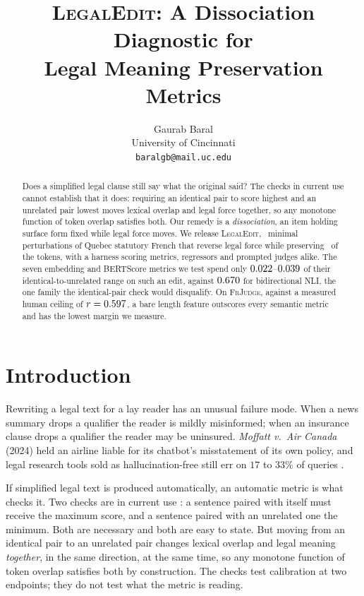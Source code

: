 \documentclass[11pt]{article}
\title{\textsc{LegalEdit}: A Dissociation Diagnostic for\\Legal Meaning Preservation Metrics}
\author{Gaurab Baral \\
  University of Cincinnati \\
  \texttt{baralgb@mail.uc.edu}}
\begin{document}
\maketitle

\begin{abstract}
Does a simplified legal clause still say what the original said? The checks in
current use cannot establish that it does: requiring an identical pair to score
highest and an unrelated pair lowest moves lexical overlap and legal force
together, so any monotone function of token overlap satisfies both. Our remedy
is a \emph{dissociation}, an item holding surface form fixed while legal force
moves. We release \textsc{LegalEdit}, \numedits\ minimal perturbations of Quebec
statutory French that reverse legal force while preserving \meanjaccard\ of the
tokens, with a harness scoring metrics, regressors and prompted judges alike.
The seven embedding and BERTScore metrics we test spend only
$0.022$--$0.039$ of their identical-to-unrelated range on such an
edit, against $0.670$ for bidirectional NLI, the one family the
identical-pair check would disqualify. On \textsc{FrJudge}, against a measured
human ceiling of $r=0.597$, a bare length feature outscores every semantic
metric and has the lowest margin we measure.
\end{abstract}

\section{Introduction}
\label{sec:intro}

Rewriting a legal text for a lay reader has an unusual failure mode. When a news
summary drops a qualifier the reader is mildly misinformed; when an insurance
clause drops a qualifier the reader may be uninsured. \emph{Moffatt v.\ Air
Canada} (2024) held an airline liable for its chatbot's misstatement of its own
policy, and legal research tools sold as hallucination-free still err on $17$ to
$33\%$ of queries \citep{magesh2025hallucinationfree}.

If simplified legal text is produced automatically, an automatic metric is what
checks it. Two checks are in current use \citep{beauchemin2023meaningbert,
beauchemin2025judgebert}: a sentence paired with itself must receive the maximum
score, and a sentence paired with an unrelated one the minimum. Both are
necessary and both are easy to state. But moving from an identical pair to an unrelated pair changes lexical
overlap and legal meaning \emph{together}, in the same direction, at the same
time, so any monotone function of token overlap satisfies both by construction.
The checks test calibration at two endpoints; they do not test what the metric
is reading.
\end{document}

